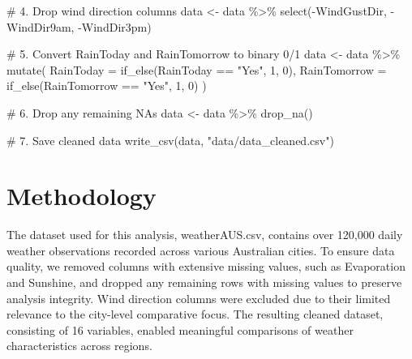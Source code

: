\documentclass[
  letterpaper,
  DIV=11,
  numbers=noendperiod]{scrartcl}
\newenvironment{Shaded}{\begin{snugshade}}{\end{snugshade}}
\newcommand{\AttributeTok}[1]{\textcolor[rgb]{0.40,0.45,0.13}{#1}}
\newcommand{\CommentTok}[1]{\textcolor[rgb]{0.37,0.37,0.37}{#1}}
\newcommand{\DecValTok}[1]{\textcolor[rgb]{0.68,0.00,0.00}{#1}}
\newcommand{\FunctionTok}[1]{\textcolor[rgb]{0.28,0.35,0.67}{#1}}
\newcommand{\NormalTok}[1]{\textcolor[rgb]{0.00,0.23,0.31}{#1}}
\newcommand{\OtherTok}[1]{\textcolor[rgb]{0.00,0.23,0.31}{#1}}
\newcommand{\SpecialCharTok}[1]{\textcolor[rgb]{0.37,0.37,0.37}{#1}}
\newcommand{\StringTok}[1]{\textcolor[rgb]{0.13,0.47,0.30}{#1}}
\begin{document}
\begin{Shaded}
\begin{Highlighting}[]
\CommentTok{\# 4. Drop wind direction columns}
\NormalTok{data }\OtherTok{\textless{}{-}}\NormalTok{ data }\SpecialCharTok{\%\textgreater{}\%}
  \FunctionTok{select}\NormalTok{(}\SpecialCharTok{{-}}\NormalTok{WindGustDir, }\SpecialCharTok{{-}}\NormalTok{WindDir9am, }\SpecialCharTok{{-}}\NormalTok{WindDir3pm)}

\CommentTok{\# 5. Convert RainToday and RainTomorrow to binary 0/1}
\NormalTok{data }\OtherTok{\textless{}{-}}\NormalTok{ data }\SpecialCharTok{\%\textgreater{}\%}
  \FunctionTok{mutate}\NormalTok{(}
    \AttributeTok{RainToday =} \FunctionTok{if\_else}\NormalTok{(RainToday }\SpecialCharTok{==} \StringTok{"Yes"}\NormalTok{, }\DecValTok{1}\NormalTok{, }\DecValTok{0}\NormalTok{),}
    \AttributeTok{RainTomorrow =} \FunctionTok{if\_else}\NormalTok{(RainTomorrow }\SpecialCharTok{==} \StringTok{"Yes"}\NormalTok{, }\DecValTok{1}\NormalTok{, }\DecValTok{0}\NormalTok{)}
\NormalTok{  )}

\CommentTok{\# 6. Drop any remaining NAs}
\NormalTok{data }\OtherTok{\textless{}{-}}\NormalTok{ data }\SpecialCharTok{\%\textgreater{}\%} \FunctionTok{drop\_na}\NormalTok{()}
\end{Highlighting}
\end{Shaded}

\begin{Shaded}
\begin{Highlighting}[]
\CommentTok{\# 7. Save cleaned data}
\FunctionTok{write\_csv}\NormalTok{(data, }\StringTok{"data/data\_cleaned.csv"}\NormalTok{)}
\end{Highlighting}
\end{Shaded}

\section{Methodology}\label{methodology}

The dataset used for this analysis, weatherAUS.csv, contains over
120,000 daily weather observations recorded across various Australian
cities. To ensure data quality, we removed columns with extensive
missing values, such as Evaporation and Sunshine, and dropped any
remaining rows with missing values to preserve analysis integrity. Wind
direction columns were excluded due to their limited relevance to the
city-level comparative focus. The resulting cleaned dataset, consisting
of 16 variables, enabled meaningful comparisons of weather
characteristics across regions.
\end{document}

